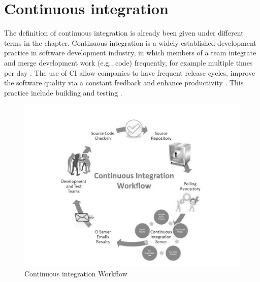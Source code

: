 \documentclass[../main.tex]{subfiles}
\begin{document}
\section{Continuous integration}
The definition of continuous integration is already been given under different terms in the chapter. Continuous integration is a widely established development practice in software development industry, in which members of a team integrate and merge development work (e.g., code) frequently, for example multiple times per day \cite{fitzgerald2017continuous}. The use of CI allow companies to have frequent release cycles, improve the software quality via a constant feedback and enhance productivity \cite{fitzgerald2017continuous}. This practice include building and testing \cite{7057604}.
\begin{figure}[h]
    \centering
    \includegraphics[width=0.8\linewidth]{images_folder/CI.jpg}
    \caption{Continuous integration Workflow}
    \label{fig:Continous Integration}
\end{figure}
\cleardoublepage
\end{document}
